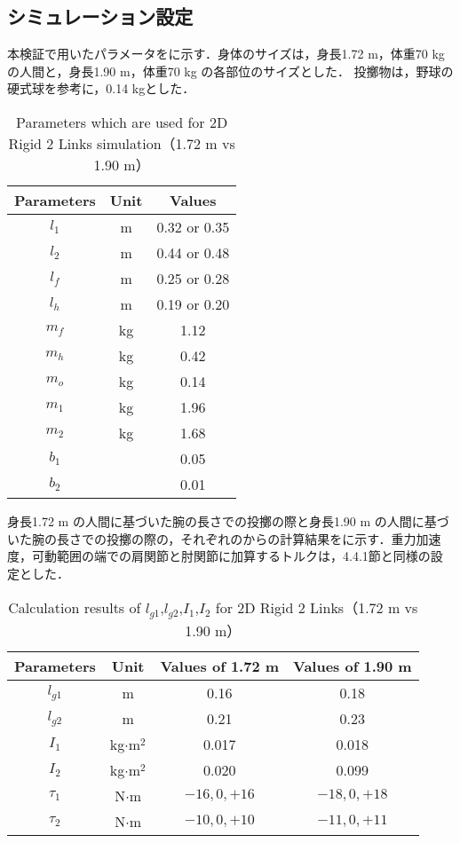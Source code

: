 \subsection{シミュレーション設定}
本検証で用いたパラメータをに示す．身体のサイズは，身長1.72 m，体重70 kgの人間と，身長1.90 m，体重70 kg の各部位のサイズとした．
投擲物は，野球の硬式球を参考に，0.14 kgとした．
\begin{table}[tb]
  \begin{center}
    \caption{Parameters which are used for 2D Rigid 2 Links simulation（1.72 m vs 1.90 m）}
    \begin{tabular}{c|c|c}
      \hline
      Parameters & Unit & Values \\
      \hline
      $l_{1}$ & m & 0.32 or 0.35 \\
      $l_{2}$ & m & 0.44 or 0.48 \\
      $l_{f}$ & m & 0.25 or 0.28 \\
      $l_{h}$ & m & 0.19 or 0.20 \\
      $m_{f}$ & kg & 1.12 \\
      $m_{h}$ & kg & 0.42 \\
      $m_{o}$ & kg & 0.14 \\
      $m_{1}$ & kg & 1.96 \\
      $m_{2}$ & kg & 1.68 \\
      $b_{1}$ &  & 0.05 \\
      $b_{2}$ &  & 0.01 \\
      \hline
    \end{tabular}
  \end{center}
\end{table}


身長1.72 m の人間に基づいた腕の長さでの投擲の際と身長1.90 m の人間に基づいた腕の長さでの投擲の際の，それぞれのからの計算結果をに示す．重力加速度，可動範囲の端での肩関節と肘関節に加算するトルクは，4.4.1節と同様の設定とした．

\begin{table}[tb]
  \begin{center}
    \caption{Calculation results of $l_{g1}$,$l_{g2}$,$I_{1}$,$I_{2}$ for 2D Rigid 2 Links（1.72 m vs 1.90 m）}
    \begin{tabular}{c|c|c|c}
      \hline
      Parameters & Unit & Values of 1.72 m & Values of 1.90 m \\
      \hline
      $l_{g1}$ & m & 0.16 & 0.18 \\
      $l_{g2}$ & m & 0.21 & 0.23 \\
      $I_{1}$ & kg$\cdot$$\mathrm{m}^2$ & 0.017 & 0.018 \\
      $I_{2}$ & kg$\cdot$$\mathrm{m}^2$ & 0.020 & 0.099 \\
      $\tau_{1}$ & N$\cdot$m & $-16, 0, +16$ & $-18, 0, +18$ \\
      $\tau_{2}$ & N$\cdot$m & $-10, 0, +10$ & $-11, 0, +11$ \\
      \hline
    \end{tabular}
  \end{center}
\end{table}

